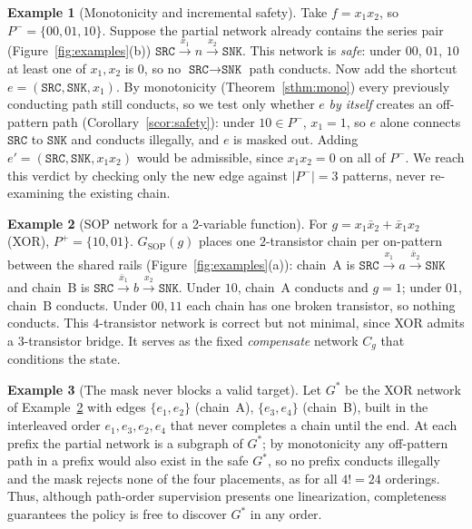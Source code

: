 \documentclass[letterpaper]{article}
\theoremstyle{plain}
\theoremstyle{definition}
\newtheorem{example}{Example}
\newcommand{\SRC}{\texttt{SRC}}
\newcommand{\SNK}{\texttt{SNK}}
\newcommand{\Pon}{P^{+}}
\newcommand{\Poff}{P^{-}}
\begin{document}
\begin{example}[Monotonicity and incremental safety]
\label{ex:mono}
Take $f = x_1 x_2$, so $\Poff=\{00,01,10\}$.
Suppose the partial network already contains the series pair
(Figure~\ref{fig:examples}(b))
$\SRC \!\xrightarrow{x_1}\! n \!\xrightarrow{x_2}\! \SNK$.
This network is \emph{safe}: under $00$, $01$, $10$ at least one of
$x_1,x_2$ is $0$, so no $\SRC\!\to\!\SNK$ path conducts.
Now add the shortcut $e=(\SRC,\SNK,x_1)$.
By monotonicity (Theorem~\ref{sthm:mono}) every previously conducting path
still conducts, so we test only whether $e$ \emph{by itself} creates an
off-pattern path (Corollary~\ref{scor:safety}): under $10\in\Poff$, $x_1=1$,
so $e$ alone connects $\SRC$ to $\SNK$ and conducts illegally, and $e$ is
masked out.  Adding $e'=(\SRC,\SNK,x_1 x_2)$ would be admissible, since
$x_1 x_2 = 0$ on all of $\Poff$.
We reach this verdict by checking only the new edge against $|\Poff|=3$
patterns, never re-examining the existing chain.
\end{example}

\begin{example}[SOP network for a 2-variable function]
\label{ex:sop}
For $g = x_1 \bar{x}_2 + \bar{x}_1 x_2$ (XOR), $\Pon = \{10, 01\}$.
$G_{\mathrm{SOP}}(g)$ places one $2$-transistor chain per on-pattern between
the shared rails (Figure~\ref{fig:examples}(a)): chain~A is
$\SRC\!\xrightarrow{x_1}\!a\!\xrightarrow{\bar{x}_2}\!\SNK$ and chain~B is
$\SRC\!\xrightarrow{\bar{x}_1}\!b\!\xrightarrow{x_2}\!\SNK$.
Under $10$, chain~A conducts and $g=1$; under $01$, chain~B conducts.
Under $00,11$ each chain has one broken transistor, so nothing conducts.
This $4$-transistor network is correct but not minimal, since XOR admits a
$3$-transistor bridge.  It serves as the fixed \emph{compensate} network
$C_g$ that conditions the state.
\end{example}

\begin{example}[The mask never blocks a valid target]
\label{ex:complete}
Let $G^*$ be the XOR network of Example~\ref{ex:sop} with edges
$\{e_1,e_2\}$ (chain~A), $\{e_3,e_4\}$ (chain~B), built in the interleaved
order $e_1,e_3,e_2,e_4$ that never completes a chain until the end.
At each prefix the partial network is a subgraph of $G^*$; by monotonicity any
off-pattern path in a prefix would also exist in the safe $G^*$, so no prefix
conducts illegally and the mask rejects none of the four placements, as for
all $4!=24$ orderings.
Thus, although path-order supervision presents one linearization, completeness
guarantees the policy is free to discover $G^*$ in any order.
\end{example}
\end{document}
